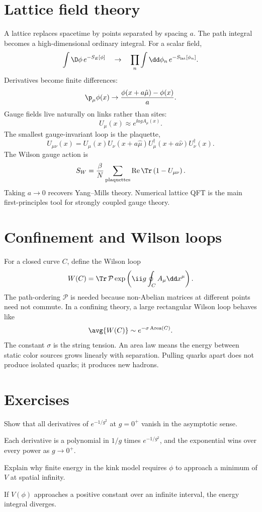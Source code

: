 \section{Lattice field theory}

A lattice replaces spacetime by points separated by spacing \(a\).  The path integral becomes a high-dimensional ordinary integral.  For a scalar field,
\[
  \int\D\phi\,e^{-S_E[\phi]}
  \quad\to\quad
  \prod_n\int\dd\phi_n\,e^{-S_{\text{lat}}[\phi_n]}.
\]
Derivatives become finite differences:
\[
  \p_\mu\phi(x)\to\frac{\phi(x+a\hat\mu)-\phi(x)}{a}.
\]
Gauge fields live naturally on links rather than sites:
\[
  U_\mu(x)\approx e^{\ii agA_\mu(x)}.
\]
The smallest gauge-invariant loop is the plaquette,
\[
  U_{\mu\nu}(x)=U_\mu(x)U_\nu(x+a\hat\mu)
  U_\mu^\dagger(x+a\hat\nu)U_\nu^\dagger(x).
\]
The Wilson gauge action is
\[
  S_W=\frac{\beta}{N}\sum_{\text{plaquettes}}
  \operatorname{Re}\Tr\left(1-U_{\mu\nu}\right).
\]
Taking \(a\to0\) recovers Yang--Mills theory.  Numerical lattice QFT is the main first-principles tool for strongly coupled gauge theory.

\section{Confinement and Wilson loops}

For a closed curve \(C\), define the Wilson loop
\[
  W(C)=\Tr\,\mathcal P\exp\left(\ii g\oint_C A_\mu\dd x^\mu\right).
\]
The path-ordering \(\mathcal P\) is needed because non-Abelian matrices at different points need not commute.  In a confining theory, a large rectangular Wilson loop behaves like
\[
  \avg{W(C)}\sim e^{-\sigma\,\text{Area}(C)}.
\]
The constant \(\sigma\) is the string tension.  An area law means the energy between static color sources grows linearly with separation.  Pulling quarks apart does not produce isolated quarks; it produces new hadrons.

\section*{Exercises}

\begin{exercise}
Show that all derivatives of \(e^{-1/g^2}\) at \(g=0^+\) vanish in the asymptotic sense.
\begin{answer}
Each derivative is a polynomial in \(1/g\) times \(e^{-1/g^2}\), and the exponential wins over every power as \(g\to0^+\).
\end{answer}
\end{exercise}

\begin{exercise}
Explain why finite energy in the kink model requires \(\phi\) to approach a minimum of \(V\) at spatial infinity.
\begin{answer}
If \(V(\phi)\) approaches a positive constant over an infinite interval, the energy integral diverges.
\end{answer}
\end{exercise}

